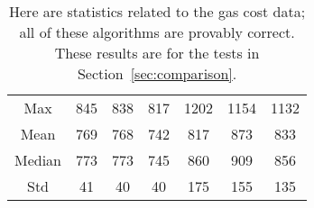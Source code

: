 \begin{table}[p]
\centering
\begin{tabular}{|c|
    |S[table-format=3.0]|S[table-format=3.0]
    |S[table-format=3.0]|S[table-format=4.0]
    |S[table-format=4.0]|S[table-format=4.0]|}
\hline
    & \UnrolledOne{} & \UnrolledTwo{} &
     \UnrolledThree{} &
    \WhileOne{} & \WhileTwo{} & \WhileThree{} \\
\hline
Max    & 845 & 838 &                       817 & 1202 & 1154 & 1132 \\
Mean   & 769 & 768 &  742 &  817 &  873 &  833 \\
Median & 773 & 773 &  745 &  860 &  909 &  856 \\
Std    &  41 &  40 &                        40 &  175 &  155 &  135 \\
\hline
\end{tabular}
\caption[Gas Costs Statistics 2]{Here are statistics
    related to the gas cost data;
    all of these algorithms are provably correct.
    These results are for the tests in Section~\ref{sec:comparison}.
    }
\label{table:gas_costs_2}
\end{table}
